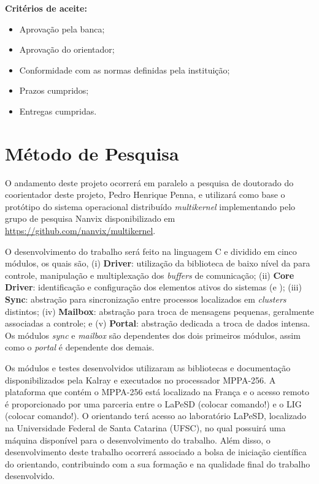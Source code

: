 \documentclass[
	12pt,				%
	openright,			%
	twoside,			%
	a4paper,			%
	english,			%
	brazil,				%
	]{abntex2}
\begin{document}
\begin{flushleft}
    \textbf{Critérios de aceite:}
    \begin{itemize}
        \item Aprovação pela banca;
        \item Aprovação do orientador;
        \item Conformidade com as normas definidas pela instituição;
        \item Prazos cumpridos;
        \item Entregas cumpridas.
    \end{itemize}
    \end{flushleft}

\chapter{Método de Pesquisa}
\label{cap:metodo-pesquisa}

    O andamento deste projeto ocorrerá em paralelo a pesquisa de doutorado do
    coorientador deste projeto, Pedro Henrique Penna, e utilizará como base o
    protótipo do sistema operacional distribuído \textit{multikernel}
    implementando pelo grupo de pesquisa Nanvix \cite{Penna2017,Penna2017-1}
    disponibilizado em \url{https://github.com/nanvix/multikernel}.
    
    O desenvolvimento do trabalho será feito na linguagem C e dividido em
    cinco módulos, os quais são,
    (i) \textbf{\noc Driver}: utilização da biblioteca de baixo nível da \noc para controle, manipulação e multiplexação dos \textit{buffers} de comunicação;
    (ii) \textbf{Core Driver}: identificação e configuração dos elementos ativos do sistemas (\ioclusters e \cpclusters); 
    (iii) \textbf{Sync}: abstração para sincronização entre processos localizados em \textit{clusters} distintos;
    (iv) \textbf{Mailbox}: abstração para troca de mensagens pequenas, geralmente associadas a controle; e 
    (v) \textbf{Portal}: abstração dedicada a troca de dados intensa. 
    Os módulos \textit{sync} e \textit{mailbox} são dependentes dos dois
    primeiros módulos, assim como o \textit{portal} é dependente dos demais.
    
    Os módulos e testes desenvolvidos utilizaram as bibliotecas e documentação
    disponibilizados pela Kalray e executados no processador MPPA-256.
    A plataforma que contém o MPPA-256 está localizado na França e o acesso
    remoto é proporcionado por uma parceria entre o LaPeSD (colocar comando!)
    e o LIG (colocar comando!).
    O orientando terá acesso ao laboratório LaPeSD, localizado na Universidade
    Federal de Santa Catarina (UFSC), no qual possuirá uma máquina disponível
    para o desenvolvimento do trabalho.
    Além disso, o desenvolvimento deste trabalho ocorrerá associado a bolsa
    de iniciação científica do orientando, contribuindo com a sua formação e
    na qualidade final do trabalho desenvolvido.
\end{document}
